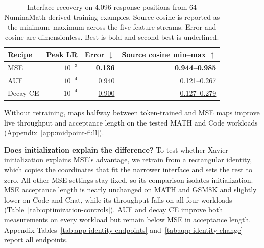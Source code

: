 \begin{table}[ht!]
\centering
\caption{Interface recovery on 4,096 response positions from 64 NuminaMath-derived training examples. Source cosine is reported as the minimum--maximum across the five feature streams. Error and cosine are dimensionless. Best is bold and second best is underlined.}
\label{tab:transfer-probe-summary}
\scriptsize
\setlength{\tabcolsep}{3pt}
\begin{tabular}{@{}lrrr@{}}
\toprule
Recipe & Peak LR & Error $\downarrow$ & \shortstack{Source cosine\\min--max $\uparrow$} \\
\midrule
MSE & $10^{-3}$ & \textbf{0.136} & \textbf{0.944--0.985} \\
AUF & $10^{-4}$ & 0.940 & 0.121--0.267 \\
Decay CE & $10^{-4}$ & \underline{0.900} & \underline{0.127--0.279} \\
\bottomrule
\end{tabular}
\end{table}

Without retraining, maps halfway between token-trained and MSE maps improve live throughput and acceptance length on the tested MATH and Code workloads (Appendix~\ref{app:midpoint-full}).

\noindent\textbf{Does initialization explain the difference?}
To test whether Xavier initialization explains MSE's advantage, we retrain from a rectangular identity, which copies the coordinates that fit the narrower interface and sets the rest to zero. All other MSE settings stay fixed, so its comparison isolates initialization. MSE acceptance length is nearly unchanged on MATH and GSM8K and slightly lower on Code and Chat, while its throughput falls on all four workloads (Table~\ref{tab:optimization-controls}). AUF and decay CE improve both measurements on every workload but remain below MSE in acceptance length. Appendix Tables~\ref{tab:app-identity-endpoints} and~\ref{tab:app-identity-change} report all endpoints.


